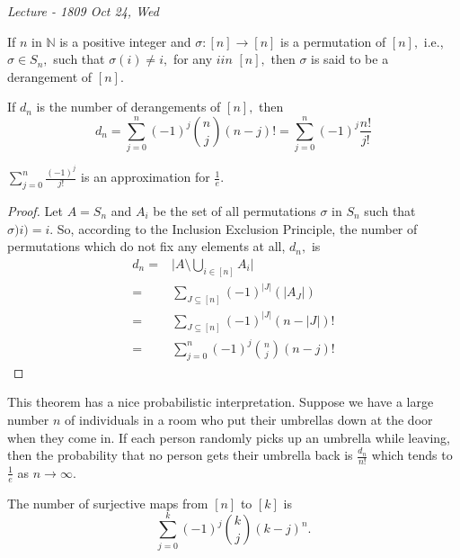 
\noindent
\emph{Lecture - 18\hfill 09 Oct 24, Wed}

\begin{definition}[Derangements]
	If $n$ in $\mathbb{N}$ is a positive integer and $\sigma \colon [n] \to [n]$ is a permutation of $[n],$ i.e., $\sigma \in S_n,$ such that
	$\sigma(i) \not = i,$ for any $i in $ $[n],$ then $\sigma$
	is said to be a derangement of $[n].$
\end{definition}
\begin{theorem}
	If $d_n$ is the number of derangements of $[n],$ then
	$$ d_n = \sum_{j=0}^{n}  (-1)^j \binom{n}{j} (n-j)!
	= \sum_{j=0}^{n} (-1)^j \frac{n!}{j!} $$
\end{theorem}

\begin{remark}
	$\sum_{j=0}^{n} \frac{(-1)^j}{j!} $ is an approximation for 
	$ \frac{1}{e}.$
\end{remark}

\begin{proof}
	Let $A = S_n$ and $A_i$ be the set of all permutations $\sigma$
	in $S_n$ such that $\sigma)i) = i.$ So, according to  the Inclusion Exclusion Principle, the number of permutations which do not fix any elements at all, $d_n,$ is
	\begin{align*}
		d_n = {}& \lvert A \setminus \bigcup_{i \in [n]} A_i \rvert \\
		={}& \sum_{J \subseteq [n]} (-1)^{ \lvert J \rvert} 
		\left( \lvert A_J \rvert \right) \\
		={}& \sum_{J \subseteq [n]} (-1)^{ \lvert J \rvert} 
		(n - \lvert J \rvert )!\\
		={}& \sum_{j=0}^{n} (-1)^j \binom{n}{j} (n-j)!
	\end{align*}
\end{proof}

This theorem has a nice probabilistic interpretation.
Suppose we have a large number $n$ of individuals in a room who put their 
umbrellas down at the door when they come in. If each person randomly picks up an umbrella while leaving, then the probability that no person gets their umbrella back is $ \frac{d_n}{n!}$ which tends to $ \frac{1}{e}$ as $n \to \infty.$

\begin{theorem}
	The number of surjective maps from $[n]$ to $[k]$ is 
	$$ \sum_{j=0}^{k} (-1)^j \binom{k}{j} (k-j)^n.$$
\end{theorem}

